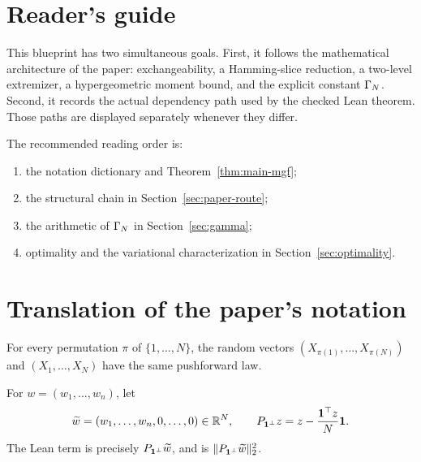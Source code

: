 \section{Reader's guide}

This blueprint has two simultaneous goals.  First, it follows the mathematical
architecture of the paper: exchangeability, a Hamming-slice reduction, a
two-level extremizer, a hypergeometric moment bound, and the explicit constant
$\Gamma_N$.  Second, it records the actual dependency path used by the checked
Lean theorem.  Those paths are displayed separately whenever they differ.

The recommended reading order is:
\begin{enumerate}[label=\arabic*.]
  \item the notation dictionary and Theorem~\ref{thm:main-mgf};
  \item the structural chain in Section~\ref{sec:paper-route};
  \item the arithmetic of $\Gamma_N$ in Section~\ref{sec:gamma};
  \item optimality and the variational characterization in
    Section~\ref{sec:optimality}.
\end{enumerate}

\section{Translation of the paper's notation}

\begin{definition}
\label{def:exchangeability}
\leanok
For every permutation $\pi$ of $\{1,\ldots,N\}$, the random vectors
$(X_{\pi(1)},\ldots,X_{\pi(N)})$ and $(X_1,\ldots,X_N)$ have the same
pushforward law.
\end{definition}

\begin{definition}
\label{def:centered-weight}
\leanok
For $w=(w_1,\ldots,w_n)$, let
\[
  \widetilde w=(w_1,\ldots,w_n,0,\ldots,0)\in\mathbb{R}^N,
  \qquad
  P_{\mathbf{1}^\perp}z=z-\frac{\mathbf{1}^\top z}{N}\mathbf{1}.
\]
The Lean term  is precisely
$P_{\mathbf{1}^\perp}\widetilde w$, and
 is
$\|P_{\mathbf{1}^\perp}\widetilde w\|_2^2$.
\end{definition}

